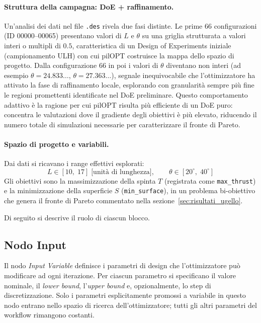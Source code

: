 \paragraph{Struttura della campagna: DoE + raffinamento.}
Un'analisi dei dati nel file \texttt{.des} rivela due fasi distinte.
Le prime 66 configurazioni (ID 00000--00065) presentano valori di $L$ e
$\theta$ su una griglia strutturata a valori interi o multipli di $0.5$,
caratteristica di un Design of Experiments iniziale (campionamento ULH) con
cui pilOPT costruisce la mappa dello spazio di progetto.
Dalla configurazione 66 in poi i valori di $\theta$ diventano non interi
(ad esempio $\theta = 24.833\ldots$, $\theta = 27.363\ldots$), segnale
inequivocabile che l'ottimizzatore ha attivato la fase di raffinamento locale,
esplorando con granularità sempre più fine le regioni promettenti identificate
nel DoE preliminare.
Questo comportamento adattivo è la ragione per cui pilOPT risulta più efficiente
di un DoE puro: concentra le valutazioni dove il gradiente degli obiettivi è
più elevato, riducendo il numero totale di simulazioni necessarie per
caratterizzare il fronte di Pareto.

\paragraph{Spazio di progetto e variabili.}
Dai dati si ricavano i range effettivi esplorati:
\begin{equation}
    L \in [10,\; 17]\;\text{[unità di lunghezza]},
    \qquad
    \theta \in [20^{\circ},\; 40^{\circ}]
\end{equation}
Gli obiettivi sono la massimizzazione della spinta $T$ (registrata come
\texttt{max\_thrust}) e la minimizzazione della superficie $S$
(\texttt{min\_surface}), in un problema bi-obiettivo che genera il fronte
di Pareto commentato nella sezione~\ref{sec:risultati_ugello}.


Di seguito si descrive il ruolo di ciascun blocco.

\subsection{Nodo Input}

Il nodo \textit{Input Variable} definisce i parametri di design che
l'ottimizzatore può modificare ad ogni iterazione.
Per ciascun parametro si specificano il valore nominale, il
\textit{lower bound}, l'\textit{upper bound} e, opzionalmente, lo
step di discretizzazione.
Solo i parametri esplicitamente promossi a variabile in questo nodo
entrano nello spazio di ricerca dell'ottimizzatore; tutti gli altri
parametri del workflow rimangono costanti.

